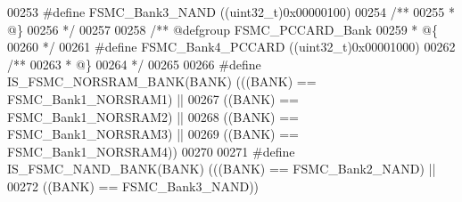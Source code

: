 \begin{DoxyCode}
00253 \textcolor{preprocessor}{#}\textcolor{preprocessor}{define} \textcolor{preprocessor}{FSMC\_Bank3\_NAND}                          \textcolor{preprocessor}{(}\textcolor{preprocessor}{(}\textcolor{preprocessor}{uint32\_t}\textcolor{preprocessor}{)}0x00000100\textcolor{preprocessor}{)}
00254 \textcolor{comment}{/**}
00255 \textcolor{comment}{  * @\}}
00256 \textcolor{comment}{  */}
00257 
00258 \textcolor{comment}{/** @defgroup FSMC\_PCCARD\_Bank }
00259 \textcolor{comment}{  * @\{}
00260 \textcolor{comment}{  */}
00261 \textcolor{preprocessor}{#}\textcolor{preprocessor}{define} \textcolor{preprocessor}{FSMC\_Bank4\_PCCARD}                        \textcolor{preprocessor}{(}\textcolor{preprocessor}{(}\textcolor{preprocessor}{uint32\_t}\textcolor{preprocessor}{)}0x00001000\textcolor{preprocessor}{)}
00262 \textcolor{comment}{/**}
00263 \textcolor{comment}{  * @\}}
00264 \textcolor{comment}{  */}
00265 
00266 \textcolor{preprocessor}{#}\textcolor{preprocessor}{define} \textcolor{preprocessor}{IS\_FSMC\_NORSRAM\_BANK}\textcolor{preprocessor}{(}\textcolor{preprocessor}{BANK}\textcolor{preprocessor}{)} \textcolor{preprocessor}{(}\textcolor{preprocessor}{(}\textcolor{preprocessor}{(}\textcolor{preprocessor}{BANK}\textcolor{preprocessor}{)} \textcolor{preprocessor}{==} FSMC_Bank1_NORSRAM1\textcolor{preprocessor}{)} \textcolor{preprocessor}{||}
00267                                     \textcolor{preprocessor}{(}\textcolor{preprocessor}{(}\textcolor{preprocessor}{BANK}\textcolor{preprocessor}{)} \textcolor{preprocessor}{==} FSMC_Bank1_NORSRAM2\textcolor{preprocessor}{)} \textcolor{preprocessor}{||}
00268                                     \textcolor{preprocessor}{(}\textcolor{preprocessor}{(}\textcolor{preprocessor}{BANK}\textcolor{preprocessor}{)} \textcolor{preprocessor}{==} FSMC_Bank1_NORSRAM3\textcolor{preprocessor}{)} \textcolor{preprocessor}{||}
00269                                     \textcolor{preprocessor}{(}\textcolor{preprocessor}{(}\textcolor{preprocessor}{BANK}\textcolor{preprocessor}{)} \textcolor{preprocessor}{==} FSMC_Bank1_NORSRAM4\textcolor{preprocessor}{)}\textcolor{preprocessor}{)}
00270 
00271 \textcolor{preprocessor}{#}\textcolor{preprocessor}{define} \textcolor{preprocessor}{IS\_FSMC\_NAND\_BANK}\textcolor{preprocessor}{(}\textcolor{preprocessor}{BANK}\textcolor{preprocessor}{)} \textcolor{preprocessor}{(}\textcolor{preprocessor}{(}\textcolor{preprocessor}{(}\textcolor{preprocessor}{BANK}\textcolor{preprocessor}{)} \textcolor{preprocessor}{==} FSMC_Bank2_NAND\textcolor{preprocessor}{)} \textcolor{preprocessor}{||}
00272                                  \textcolor{preprocessor}{(}\textcolor{preprocessor}{(}\textcolor{preprocessor}{BANK}\textcolor{preprocessor}{)} \textcolor{preprocessor}{==} FSMC_Bank3_NAND\textcolor{preprocessor}{)}\textcolor{preprocessor}{)}

\end{DoxyCode}

